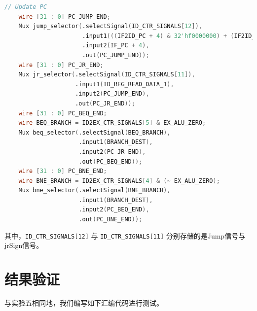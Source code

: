 \documentclass{cumcm}
\numberwithin{equation}{section}
\numberwithin{equation}{subsection}
\begin{document}
\begin{lstlisting}[language=verilog]
    // Update PC
    wire [31 : 0] PC_JUMP_END;
    Mux jump_selector(.selectSignal(ID_CTR_SIGNALS[12]), 
                      .input1(((IF2ID_PC + 4) & 32'hf0000000) + (IF2ID_INST [25 : 0] << 2)), 
                      .input2(IF_PC + 4),
                      .out(PC_JUMP_END));
    wire [31 : 0] PC_JR_END;
    Mux jr_selector(.selectSignal(ID_CTR_SIGNALS[11]),
                    .input1(ID_REG_READ_DATA_1),
                    .input2(PC_JUMP_END),
                    .out(PC_JR_END));
    wire [31 : 0] PC_BEQ_END;
    wire BEQ_BRANCH = ID2EX_CTR_SIGNALS[5] & EX_ALU_ZERO;    
    Mux beq_selector(.selectSignal(BEQ_BRANCH),
                     .input1(BRANCH_DEST),
                     .input2(PC_JR_END),
                     .out(PC_BEQ_END));
    wire [31 : 0] PC_BNE_END;
    wire BNE_BRANCH = ID2EX_CTR_SIGNALS[4] & (~ EX_ALU_ZERO);
    Mux bne_selector(.selectSignal(BNE_BRANCH),
                     .input1(BRANCH_DEST),
                     .input2(PC_BEQ_END),
                     .out(PC_BNE_END));
\end{lstlisting}

其中，\texttt{ID\_CTR\_SIGNALS[12]} 与 \texttt{ID\_CTR\_SIGNALS[11]} 分别存储的是Jump信号与jrSign信号。
\clearpage
\section{结果验证}\label{section4}
与实验五相同地，我们编写如下汇编代码进行测试。
\end{document}
